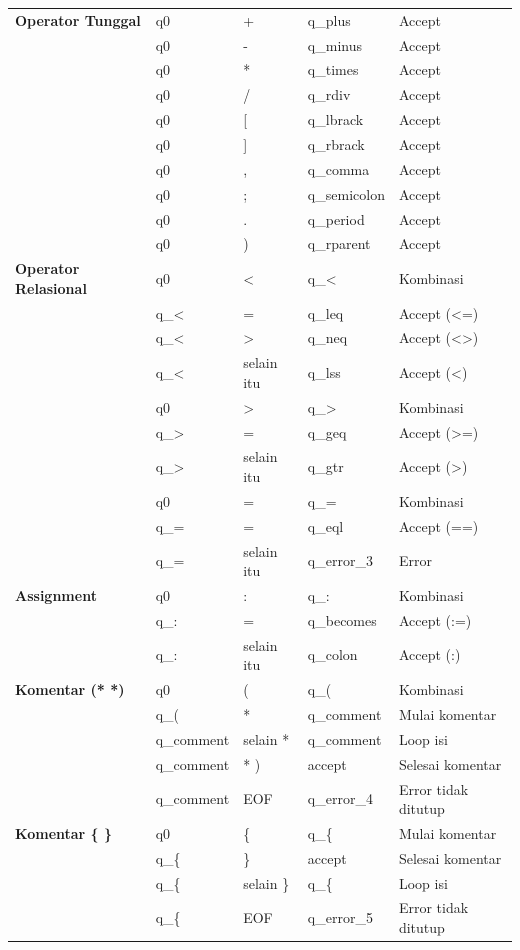 \documentclass[12pt,a4paper]{article}
\begin{document}
\begin{small}
\begin{longtable}{|>{\raggedright\arraybackslash}p{2.7cm}|>{\raggedright\arraybackslash}p{2.2cm}|>{\raggedright\arraybackslash}p{2.6cm}|>{\raggedright\arraybackslash}p{2.2cm}|>{\raggedright\arraybackslash}p{5.2cm}|}
\textbf{Operator Tunggal} & q0 & + & q\_plus & Accept \\
 & q0 & - & q\_minus & Accept \\
 & q0 & * & q\_times & Accept \\
 & q0 & / & q\_rdiv & Accept \\
 & q0 & [ & q\_lbrack & Accept \\
 & q0 & ] & q\_rbrack & Accept \\
 & q0 & , & q\_comma & Accept \\
 & q0 & ; & q\_semicolon & Accept \\
 & q0 & . & q\_period & Accept \\
 & q0 & ) & q\_rparent & Accept \\
\hline

\textbf{Operator Relasional} & q0 & < & q\_< & Kombinasi \\
 & q\_< & = & q\_leq & Accept (<=) \\
 & q\_< & > & q\_neq & Accept (<>) \\
 & q\_< & selain itu & q\_lss & Accept (<) \\
 & q0 & > & q\_> & Kombinasi \\
 & q\_> & = & q\_geq & Accept (>=) \\
 & q\_> & selain itu & q\_gtr & Accept (>) \\
 & q0 & = & q\_= & Kombinasi \\
 & q\_= & = & q\_eql & Accept (==) \\
 & q\_= & selain itu & q\_error\_3 & Error \\
\hline

\textbf{Assignment} & q0 & : & q\_: & Kombinasi \\
 & q\_: & = & q\_becomes & Accept (:=) \\
 & q\_: & selain itu & q\_colon & Accept (:) \\
\hline

\textbf{Komentar (* *)} & q0 & ( & q\_( & Kombinasi \\
 & q\_( & * & q\_comment & Mulai komentar \\
 & q\_comment & selain * & q\_comment & Loop isi \\
 & q\_comment & * ) & accept & Selesai komentar \\
 & q\_comment & EOF & q\_error\_4 & Error tidak ditutup \\
\hline

\textbf{Komentar \{ \}} & q0 & \{ & q\_\{ & Mulai komentar \\
 & q\_\{ & \} & accept & Selesai komentar \\
 & q\_\{ & selain \} & q\_\{ & Loop isi \\
 & q\_\{ & EOF & q\_error\_5 & Error tidak ditutup \\
\hline


\end{longtable}
\end{small}
\end{document}
